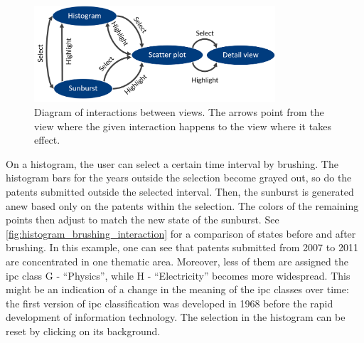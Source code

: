 \begin{figure}[!]
\centering
\includegraphics[width=0.8\textwidth]{img/interactions_between_views}
\caption{Diagram of interactions between views. The arrows point from the view where the given interaction happens to the view where it takes effect.}
\label{fig:interactions_between_views}
\end{figure}

On a histogram, the user can select a certain time interval by brushing.
The histogram bars for the years outside the selection become grayed out, so do the patents submitted outside the selected interval.
Then, the sunburst is generated anew based only on the patents within the selection.
The colors of the remaining points then adjust to match the new state of the sunburst.
See \autoref{fig:histogram_brushing_interaction} for a comparison of states before and after brushing.
In this example, one can see that patents submitted from 2007 to 2011 are concentrated in one thematic area.
Moreover, less of them are assigned the \gls{ipc} class G - ``Physics'', while H - ``Electricity'' becomes more widespread.
This might be an indication of a change in the meaning of the \gls{ipc} classes over time: the first version of \gls{ipc} classification was developed in 1968 before the rapid development of information technology.
The selection in the histogram can be reset by clicking on its background.

